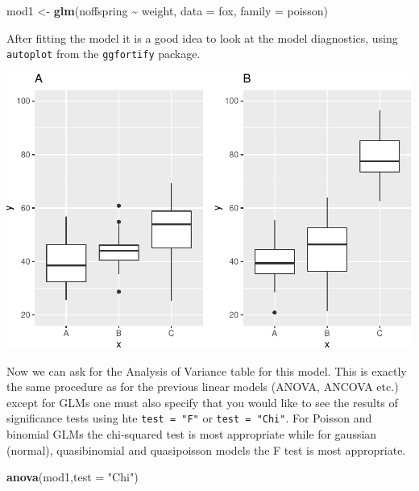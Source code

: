 \documentclass[
  a4paperpaper,
]{book}
\newenvironment{Shaded}{\begin{snugshade}}{\end{snugshade}}
\newcommand{\DataTypeTok}[1]{\textcolor[rgb]{0.13,0.29,0.53}{#1}}
\newcommand{\KeywordTok}[1]{\textcolor[rgb]{0.13,0.29,0.53}{\textbf{#1}}}
\newcommand{\NormalTok}[1]{#1}
\newcommand{\OperatorTok}[1]{\textcolor[rgb]{0.81,0.36,0.00}{\textbf{#1}}}
\newcommand{\StringTok}[1]{\textcolor[rgb]{0.31,0.60,0.02}{#1}}
\begin{document}
\begin{Shaded}
\begin{Highlighting}[]
\NormalTok{mod1 \textless{}{-}}\StringTok{ }\KeywordTok{glm}\NormalTok{(noffspring }\OperatorTok{\textasciitilde{}}\StringTok{ }\NormalTok{weight, }\DataTypeTok{data =}\NormalTok{ fox, }\DataTypeTok{family =}\NormalTok{ poisson)}
\end{Highlighting}
\end{Shaded}

After fitting the model it is a good idea to look at the model diagnostics, using \texttt{autoplot} from the \texttt{ggfortify} package.

\begin{center}\includegraphics{BB852_files/figure-latex/unnamed-chunk-233-1} \end{center}

Now we can ask for the Analysis of Variance table for this model. This is exactly the same procedure as for the previous linear models (ANOVA, ANCOVA etc.) except for GLMs one must also specify that you would like to see the results of significance tests using hte \texttt{test\ =\ "F"} or \texttt{test\ =\ "Chi"}. For Poisson and binomial GLMs the chi-squared test is most appropriate while for gaussian (normal), quasibinomial and quasipoisson models the F test is most appropriate.

\begin{Shaded}
\begin{Highlighting}[]
\KeywordTok{anova}\NormalTok{(mod1,}\DataTypeTok{test =} \StringTok{"Chi"}\NormalTok{)}
\end{Highlighting}
\end{Shaded}
\end{document}
